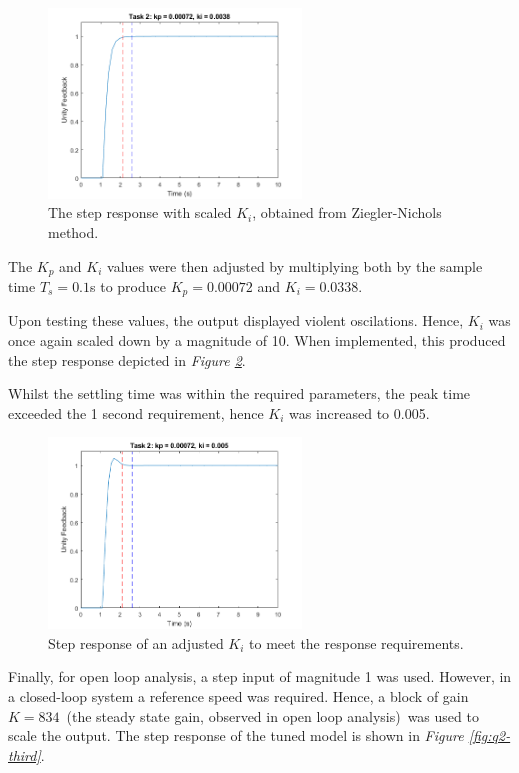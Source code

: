 \documentclass[11pt, onecolumn]{article}
\begin{document}
\begin{figure}[h!]
    \centering
    \includegraphics[width=0.6\textwidth]{q2-g2.png}
    \caption{The step response with scaled $K_i$, obtained from Ziegler-Nichols method.}
    \label{fig:q2-first}
\end{figure}
\par The $K_p$ and $K_i$ values were then adjusted by multiplying both by the sample time $T_s = 0.1$s to produce $K_p = 0.00072$ and $K_i = 0.0338$.
\par Upon testing these values, the output displayed violent oscilations. Hence, $K_i$ was once again scaled down by a magnitude of 10. When implemented, this produced the step response depicted in \textit{Figure \ref{fig:q2-second}}.
\par Whilst the settling time was within the required parameters, the peak time exceeded the 1 second requirement, hence $K_i$ was increased to 0.005.
\begin{figure}[h!]
    \centering
    \includegraphics[width=0.6\textwidth]{q2-g3.png}
    \caption{Step response of an adjusted $K_i$ to meet the response requirements.}
    \label{fig:q2-second}
\end{figure}
\par Finally, for open loop analysis, a step input of magnitude 1 was used. However, in a closed-loop system a reference speed was required. Hence, a block of gain $K=834$ (the steady state gain, observed in open loop analysis) was used to scale the output. The step response of the tuned model is shown in \textit{Figure \ref{fig:q2-third}}.
\end{document}

